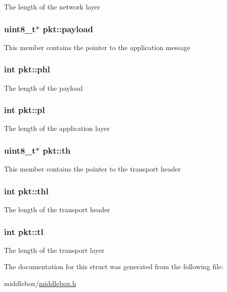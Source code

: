 The length of the network layer \hypertarget{structpkt_aa213efd0a76015d65f6f4ba745e49d99}{
\subsubsection[{payload}]{\setlength{\rightskip}{0pt plus 5cm}uint8\-\_\-t$\ast$ pkt\-::payload}}\label{structpkt_aa213efd0a76015d65f6f4ba745e49d99}
This member contains the pointer to the application message \hypertarget{structpkt_af6de953e144105f8774169652ac73204}{
\subsubsection[{phl}]{\setlength{\rightskip}{0pt plus 5cm}int pkt\-::phl}}\label{structpkt_af6de953e144105f8774169652ac73204}
The length of the payload \hypertarget{structpkt_ab298557ecf4db28c7e7cffa2fd72779a}{
\subsubsection[{pl}]{\setlength{\rightskip}{0pt plus 5cm}int pkt\-::pl}}\label{structpkt_ab298557ecf4db28c7e7cffa2fd72779a}
The length of the application layer \hypertarget{structpkt_a5ebbe76e5d11cb6414429b60fe92146c}{
\subsubsection[{th}]{\setlength{\rightskip}{0pt plus 5cm}uint8\-\_\-t$\ast$ pkt\-::th}}\label{structpkt_a5ebbe76e5d11cb6414429b60fe92146c}
This member contains the pointer to the transport header \hypertarget{structpkt_a240625d5ce4002682cec58d51a92f908}{
\subsubsection[{thl}]{\setlength{\rightskip}{0pt plus 5cm}int pkt\-::thl}}\label{structpkt_a240625d5ce4002682cec58d51a92f908}
The length of the transport header \hypertarget{structpkt_a669c31685e5eb281e5b40e59bdc3218d}{
\subsubsection[{tl}]{\setlength{\rightskip}{0pt plus 5cm}int pkt\-::tl}}\label{structpkt_a669c31685e5eb281e5b40e59bdc3218d}
The length of the transport layer 

The documentation for this struct was generated from the following file\-:\begin{DoxyCompactItemize}
\item 
middlebox/\hyperlink{middlebox_8h}{middlebox.\-h}\end{DoxyCompactItemize}

